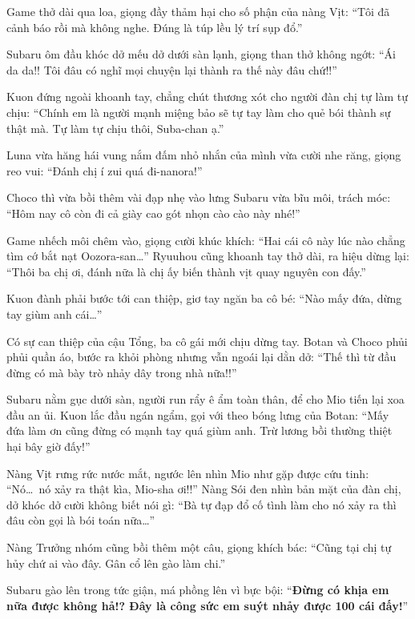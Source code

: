 \documentclass[../main.tex]{subfiles}
\begin{document}

Game thở dài qua loa, giọng đầy thảm hại cho số phận của nàng Vịt: ``Tôi đã cảnh báo rồi mà không nghe. Đúng là túp lều lý trí sụp đổ.''

Subaru ôm đầu khóc dở mếu dở dưới sàn lạnh, giọng than thở không ngớt: ``Ái da da!! Tôi đâu có nghĩ mọi chuyện lại thành ra thế này đâu chứ!!''

Kuon đứng ngoài khoanh tay, chẳng chút thương xót cho người đàn chị tự làm tự chịu: ``Chính em là người mạnh miệng bảo sẽ tự tay làm cho quẻ bói thành sự thật mà. Tự làm tự chịu thôi, Suba-chan ạ.''

Luna vừa hăng hái vung nắm đấm nhỏ nhắn của mình vừa cười nhe răng, giọng reo vui: ``Đánh chị í zui quá đi-nanora!''

Choco thì vừa bồi thêm vài đạp nhẹ vào lưng Subaru vừa bĩu môi, trách móc: ``Hôm nay cô còn đi cả giày cao gót nhọn cào cào này nhé!''

Game nhếch môi chêm vào, giọng cười khúc khích: ``Hai cái cô này lúc nào chẳng tìm cớ bắt nạt Oozora-san\dots'' Ryuuhou cũng khoanh tay thở dài, ra hiệu dừng lại: ``Thôi ba chị ơi, đánh nữa là chị ấy biến thành vịt quay nguyên con đấy.''

Kuon đành phải bước tới can thiệp, giơ tay ngăn ba cô bé: ``Nào mấy đứa, dừng tay giùm anh cái\dots''

Có sự can thiệp của cậu Tổng, ba cô gái mới chịu dừng tay. Botan và Choco phủi phủi quần áo, bước ra khỏi phòng nhưng vẫn ngoái lại dằn dở: ``Thế thì từ đầu đừng có mà bày trò nhảy dây trong nhà nữa!!''

Subaru nằm gục dưới sàn, người run rẩy ê ẩm toàn thân, để cho Mio tiến lại xoa đầu an ủi. Kuon lắc đầu ngán ngẩm, gọi với theo bóng lưng của Botan: ``Mấy đứa làm ơn cũng đừng có mạnh tay quá giùm anh. Trừ lương bồi thường thiệt hại bây giờ đấy!''

Nàng Vịt rưng rức nước mắt, ngước lên nhìn Mio như gặp được cứu tinh: ``Nó\dots\ nó xảy ra thật kìa, Mio-sha ơi!!'' Nàng Sói đen nhìn bản mặt của đàn chị, dở khóc dở cười không biết nói gì: ``Bà tự đạp đổ cố tình làm cho nó xảy ra thì đâu còn gọi là bói toán nữa\dots''

Nàng Trưởng nhóm cũng bồi thêm một câu, giọng khích bác: ``Cũng tại chị tự hủy chứ ai vào đây. Gân cổ lên gào làm chi.''

Subaru gào lên trong tức giận, má phồng lên vì bực bội: ``\textbf{Đừng có khịa em nữa được không hả!? Đây là công sức em suýt nhảy được 100 cái đấy!}''
\end{document}
